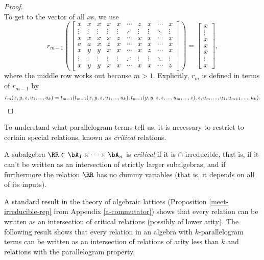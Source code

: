 \begin{proof}
\[\]
To get to the vector of all $x$s, we use
\[
r_{m-1}\left(\begin{bmatrix} x & x & x & x & x & \cdots & z & x & \cdots & x\\ \vdots & \vdots & \vdots & \vdots & \vdots & \iddots & \vdots & \vdots & \ddots & \vdots \\ x & x & x & x & z & \cdots & x & x & \cdots & x\\ a & a & x & z & x & \cdots & x & x & \cdots & x\\ x & y & y & x & x & \cdots & x & z & \cdots & x\\ \vdots & \vdots & \vdots & \vdots & \vdots & \iddots & \vdots & \vdots & \ddots & \vdots \\ x & y & y & x & x & \cdots & x & x & \cdots & z\end{bmatrix}\right) = \begin{bmatrix} x\\ \vdots \\ x\\ x\\ x\\ \vdots \\ x\end{bmatrix},
\]
where the middle row works out because $m > 1$. Explicitly, $r_{m}$ is defined in terms of $r_{m-1}$ by
\[
r_{m}(x,y,z,u_1,...,u_k) = t_{m-1}(t_{m-1}(x,y,z,u_1,...,u_k),t_{m-1}(y,y,z,z,...,u_{m},...,z),z,u_{m},...,u_1,u_{m+1},...,u_k).\qedhere
\]
\end{proof}

To understand what parallelogram terms tell us, it is necessary to restrict to certain special relations, known as \emph{critical} relations.

\begin{defn} A subalgebra $\RR \in \bA_1 \times \cdots \times \bA_n$ is \emph{critical} if it is $\cap$-irreducible, that is, if it can't be written as an intersection of strictly larger subalgebras, and if furthermore the relation $\RR$ has no dummy variables (that is, it depends on all of its inputs).
\end{defn}

A standard result in the theory of algebraic lattices (Proposition \ref{meet-irreducible-rep} from Appendix \ref{a-commutator}) shows that every relation can be written as an intersection of critical relations (possibly of lower arity). The following result shows that every relation in an algebra with $k$-parallelogram terms can be written as an intersection of relations of arity less than $k$ and relations with the parallelogram property.

